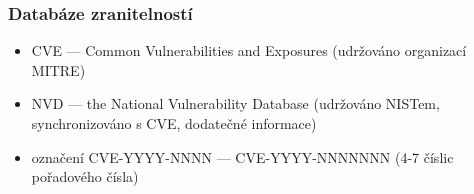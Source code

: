 \subsubsection*{Databáze zranitelností}
\begin{itemize}
	\item CVE --- Common Vulnerabilities and Exposures (udržováno organizací MITRE)
	\item NVD --- the National Vulnerability Database (udržováno NISTem, synchronizováno s CVE, dodatečné informace)
	\item označení CVE-YYYY-NNNN --- CVE-YYYY-NNNNNNN (4-7 číslic pořadového čísla)
\end{itemize}